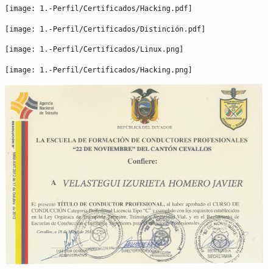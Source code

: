 {    
\begin{figure}[ht]
    \setlength{\parindent}{-10pt}
    \texttt{[image: 1.-Perfil/Certificados/Hacking.pdf]}
\end{figure}



}{%

\begin{figure}[ht]
    \setlength{\parindent}{-10pt}
    \texttt{[image: 1.-Perfil/Certificados/Distinción.pdf]}
\end{figure}

\begin{figure}[ht]
    \setlength{\parindent}{-20pt}
    \texttt{[image: 1.-Perfil/Certificados/Linux.png]}
    \centering
\end{figure}


\begin{figure}[ht]
    \setlength{\parindent}{-20pt}
    \texttt{[image: 1.-Perfil/Certificados/Hacking.png]}
    \centering
\end{figure}

\begin{figure}[ht]
    \setlength{\parindent}{-20pt}
    \includegraphics[width=1.4\textwidth, angle=90]{1.-Perfil/Certificados/Conductor.png}
    \centering
\end{figure}
}